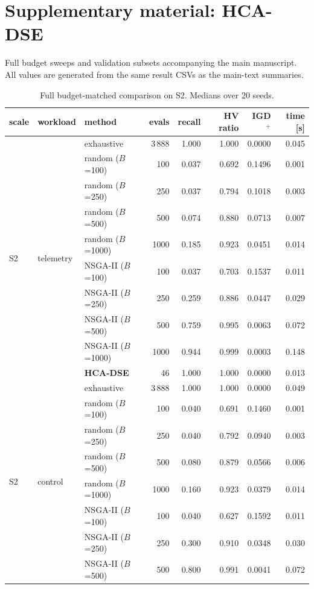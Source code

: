 \documentclass[preprint,11pt,3p]{elsarticle}
\begin{document}
\section*{Supplementary material: HCA-DSE}
Full budget sweeps and validation subsets accompanying the main manuscript.
All values are generated from the same result CSVs as the main-text summaries.
\begin{table}[!htbp]\centering
\caption{Full budget-matched comparison on S2. Medians over 20 seeds.}
\scriptsize
\begin{tabular}{lllrrrrr}
\toprule
scale & workload & method & evals & recall & HV ratio & IGD$^{+}$ & time [s] \\
\midrule
\multirow{10}{*}{S2} & \multirow{10}{*}{telemetry} & exhaustive & 3\,888 & 1.000 & 1.000 & 0.0000 & 0.045 \\
 & & random ($B$=100) & 100 & 0.037 & 0.692 & 0.1496 & 0.001 \\
 & & random ($B$=250) & 250 & 0.037 & 0.794 & 0.1018 & 0.003 \\
 & & random ($B$=500) & 500 & 0.074 & 0.880 & 0.0713 & 0.007 \\
 & & random ($B$=1000) & 1000 & 0.185 & 0.923 & 0.0451 & 0.014 \\
 & & NSGA-II ($B$=100) & 100 & 0.037 & 0.703 & 0.1537 & 0.011 \\
 & & NSGA-II ($B$=250) & 250 & 0.259 & 0.886 & 0.0447 & 0.029 \\
 & & NSGA-II ($B$=500) & 500 & 0.759 & 0.995 & 0.0063 & 0.072 \\
 & & NSGA-II ($B$=1000) & 1000 & 0.944 & 0.999 & 0.0003 & 0.148 \\
 & & \textbf{HCA-DSE} & 46 & 1.000 & 1.000 & 0.0000 & 0.013 \\
\midrule
\multirow{10}{*}{S2} & \multirow{10}{*}{control} & exhaustive & 3\,888 & 1.000 & 1.000 & 0.0000 & 0.049 \\
 & & random ($B$=100) & 100 & 0.040 & 0.691 & 0.1460 & 0.001 \\
 & & random ($B$=250) & 250 & 0.040 & 0.792 & 0.0940 & 0.003 \\
 & & random ($B$=500) & 500 & 0.080 & 0.879 & 0.0566 & 0.006 \\
 & & random ($B$=1000) & 1000 & 0.160 & 0.923 & 0.0379 & 0.014 \\
 & & NSGA-II ($B$=100) & 100 & 0.040 & 0.627 & 0.1592 & 0.011 \\
 & & NSGA-II ($B$=250) & 250 & 0.300 & 0.910 & 0.0348 & 0.030 \\
 & & NSGA-II ($B$=500) & 500 & 0.800 & 0.991 & 0.0041 & 0.072 \\

\end{tabular}
\end{table}
\end{document}
